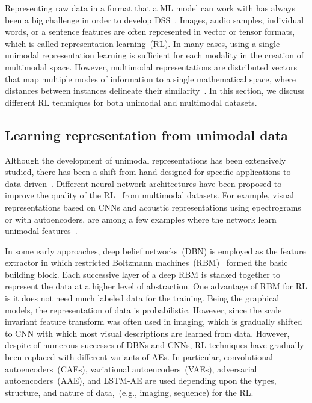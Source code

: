 \hspace*{3.5mm}Representing raw data in a format that a ML model can work with has always been a big challenge in order to develop DSS~\cite{mmsurvey}. Images, audio samples, individual words, or a sentence features are often represented in vector or tensor formats, which is called representation learning~(RL). In many cases, using a single unimodal representation learning is sufficient for each modality in the creation of multimodal space. However, multimodal representations are distributed vectors that map multiple modes of information to a single mathematical space, where distances between instances delineate their similarity~\cite{ito2018effects}. 
In this section, we discuss different RL techniques for both unimodal and multimodal datasets. 

\subsection{Learning representation from unimodal data}
Although the development of unimodal representations has been extensively studied, there has been a shift from hand-designed for specific applications to data-driven~\cite{mmsurvey}. Different neural network architectures have been proposed to improve the quality of the RL~\cite{min2018survey} from multimodal datasets. For example, visual representations based on CNNs and acoustic representations using epectrograms or with autoencoders, are among a few examples where the network learn unimodal features~\cite{ito2018effects}. 

\hspace*{3.5mm}In some early approaches, deep belief networks~(DBN) is employed as the feature extractor in which restricted Boltzmann machines~(RBM)~\cite{jaitly2011learning} formed the basic building block. Each successive layer of a deep RBM is stacked together to represent the data at a higher level of abstraction. One advantage of RBM for RL is it does not need much labeled data for the training. Being the graphical models, the representation of data is probabilistic. 
However, since the scale invariant feature transform was often used in imaging, which is gradually shifted to CNN with which most visual descriptions are learned from data.
However, despite of numerous successes of DBNs and CNNs, RL techniques have gradually been replaced with different variants of AEs. In particular, convolutional autoencoders~(CAEs), variational autoencoders~(VAEs), adversarial autoencoders~(AAE), and LSTM-AE are used depending upon the types, structure, and nature of data,~(e.g., imaging, sequence) for the RL. 

